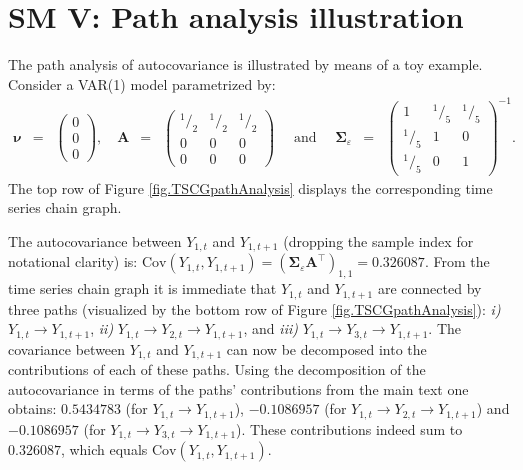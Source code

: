 \documentclass[a4paper]{article}
\newcommand*\rfrac[2]{{}^{#1}\!/_{#2}}
\begin{document}
\section*{SM V: Path analysis illustration}
The path analysis of autocovariance is illustrated by means of a toy example. Consider a VAR(1) model parametrized by:
\begin{eqnarray*}
\mathbf{\nu} \, \, \, = \, \, \,
\left(
\begin{array}{rrr}
0
\\
0
\\
0
\end{array}
\right),
\quad \mathbf{A} \, \, \, = \, \, \,
\left(
\begin{array}{rrr}
\rfrac{1}{2} & \rfrac{1}{2} & \rfrac{1}{2}
\\
0 & 0 & 0
\\
0 & 0 & 0
\end{array}
\right)
\quad \mbox{ and } \quad
\mathbf{\Sigma}_{\varepsilon} & = &
\left(
\begin{array}{rrr}
1 & \rfrac{1}{5} & \rfrac{1}{5}
\\
\rfrac{1}{5} & 1 & 0
\\
\rfrac{1}{5} & 0 & 1
\end{array}
\right)^{-1}.
\end{eqnarray*}
The top row of Figure \ref{fig.TSCGpathAnalysis} displays the corresponding time series chain graph.

The autocovariance between $Y_{1,t}$ and $Y_{1,t+1}$ (dropping the sample index for notational clarity) is: $\mbox{Cov}(Y_{1,t}, Y_{1,t+1}) = (\mathbf{\Sigma}_{\varepsilon} \mathbf{A}^{\top})_{1,1} = 0.326087$. From the time series chain graph it is immediate that $Y_{1,t}$ and $Y_{1,t+1}$  are connected by three paths (visualized by the bottom row of Figure \ref{fig.TSCGpathAnalysis}): \textit{i)} $Y_{1,t} \rightarrow Y_{1,t+1}$, \textit{ii)} $Y_{1,t} \rightarrow Y_{2,t} \rightarrow Y_{1,t+1}$, and \textit{iii)} $Y_{1,t} \rightarrow Y_{3,t} \rightarrow Y_{1,t+1}$. The	 covariance between $Y_{1,t}$ and $Y_{1,t+1}$ can now be decomposed into the contributions of each of these paths. Using the decomposition of the autocovariance in terms of the paths' contributions from the main text one obtains: $0.5434783$ (for $Y_{1,t} \rightarrow Y_{1,t+1}$), $-0.1086957$ (for $Y_{1,t} \rightarrow Y_{2,t} \rightarrow Y_{1,t+1}$) and $-0.1086957$ (for $Y_{1,t} \rightarrow Y_{3,t} \rightarrow Y_{1,t+1}$). These contributions indeed sum to $0.326087$, which equals $\mbox{Cov}(Y_{1,t}, Y_{1,t+1})$.
\end{document}
